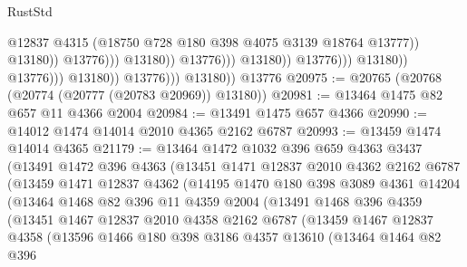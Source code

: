 \begin{lexlean}{RustStd}
\begin{coremodule}
                                                            @12837
                                                            @4315
                                                            (@18750
                                                              @728
                                                              @180
                                                              @398
                                                              @4075
                                                              @3139
                                                              @18764
                                                              @13777))
                                                          @13180))
                                                      @13776)))
                                                @13180))
                                            @13776)))
                                      @13180))
                                  @13776)))
                            @13180))
                        @13776)))
                  @13180))
              @13776)))
        @13180))
    @13776
@20975 := @20765 (@20768 (@20774 (@20777 (@20783 @20969)) @13180))
@20981 := @13464 @1475 @82 @657 @11 @4366 @2004
@20984 := @13491 @1475 @657 @4366
@20990 := @14012 @1474 @14014 @2010 @4365 @2162 @6787
@20993 := @13459 @1474 @14014 @4365
@21179 := @13464
    @1472
    @1032
    @396
    @659
    @4363
    @3437
    (@13491
      @1472
      @396
      @4363
      (@13451
        @1471
        @12837
        @2010
        @4362
        @2162
        @6787
        (@13459
          @1471
          @12837
          @4362
          (@14195
            @1470
            @180
            @398
            @3089
            @4361
            @14204
            (@13464
              @1468
              @82
              @396
              @11
              @4359
              @2004
              (@13491
                @1468
                @396
                @4359
                (@13451
                  @1467
                  @12837
                  @2010
                  @4358
                  @2162
                  @6787
                  (@13459
                    @1467
                    @12837
                    @4358
                    (@13596
                      @1466
                      @180
                      @398
                      @3186
                      @4357
                      @13610
                      (@13464
                        @1464
                        @82
                        @396

\end{coremodule}
\end{lexlean}
